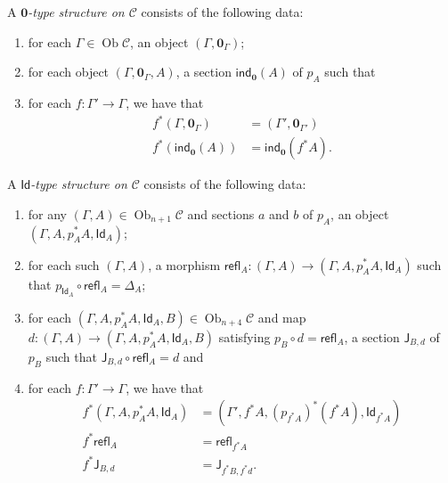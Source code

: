 \documentclass[10pt,letterpaper,cm]{nupset}
\theoremstyle{definition}
\theoremstyle{theorem}
\theoremstyle{remark}
\DeclareMathOperator{\ob}{Ob}
\newcommand{\J}{\mathsf{J}}
\newcommand{\id}{\mathsf{Id}}
\newcommand{\refl}{\mathsf{refl}}
\newcommand{\ind}{\mathsf{ind}}
\newcommand{\0}{\mathbf{0}}
\newcommand{\1}{\mathbf{1}}
\newcommand{\2}{\mathbf{2}}
\renewcommand{\c}{\mathscr{C}}
\newcommand{\be}{\begin{enumerate}}
\newcommand{\ee}{\end{enumerate}}
\begin{document}
A \textit{$\0$-type structure on $\c$} consists of the following data:
\be[label=(\roman*)]
\item for each $\Gamma \in \ob{\c}$, an object $\left(\Gamma, \0_{\Gamma}\right)$; 
\item for each object $\left(\Gamma, \0_{\Gamma}, A\right)$, a section $\ind_{\0}(A)$ of $p_A$ such that
\item for each $f: \Gamma' \to \Gamma$, we have that
\begin{align*}
f^{\ast}(\Gamma, \0_{\Gamma}) & = \left(\Gamma', \0_{\Gamma'}\right)
\\ f^{\ast}(\ind_{\0}(A)) & = \ind_{\0}(f^{\ast}{A}).
\end{align*}
\ee

\medskip

A \textit{$\id$-type structure on $\c$} consists of the following data:\label{idtype}
\be[label=(\roman*)]
\item for any $\left(\Gamma, A\right)\in \ob_{n+1}{\c}$ and sections $a$ and $b$ of $p_A$, an object $\left(\Gamma, A, p_A^{\ast}{A}, \id_A\right)$;
\item for each such $\left(\Gamma, A\right)$, a morphism $\refl_A :\left(\Gamma, A\right) \to \left(\Gamma, A, p_A^{\ast}{A}, \id_A\right)$ such that $p_{\id_A} \circ \refl_A = \Delta_A$;
\item for each $\left(\Gamma, A, p_A^{\ast}{A}, \id_A, B\right)\in \ob_{n+4}{\c}$ and map $d: \left(\Gamma, A\right) \to \left(\Gamma, A, p_A^{\ast}{A}, \id_A, B\right)$ satisfying $p_B \circ d = \refl_A$, a section $\J_{B,d}$ of $p_B$ such that $\J_{B,d} \circ \refl_A =d$ and
\item for each $f: \Gamma' \to \Gamma$, we have that
\begin{align*}
f^{\ast}(\Gamma, A, p_A^{\ast}{A}, \id_A)  & = \left(\Gamma', f^{\ast}{A}, \left(p_{f^{\ast}{A}}\right)^{\ast}(f^{\ast}{A}), \id_{f^{\ast}{A}}\right)
\\  f^{\ast}{\refl_A} & = \refl_{f^{\ast}{A}}
\\ f^{\ast}{\J_{B,d}} & = \J_{f^{\ast}{B}, f^{\ast}{d}}.
\end{align*}
\ee
\end{document}
